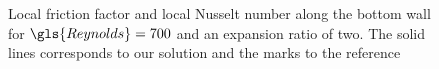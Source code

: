 \begin{figure}[tb]
	\caption{Local friction factor and local Nusselt number along the bottom wall for $\gls{Reynolds} = 700$ and an expansion ratio of two. The solid lines corresponds to our solution and the marks to the reference \citep{henninkLowMachNumberFlow2022}}
	\label{fig:fd_Nu_plot}
\end{figure}



\FloatBarrier
